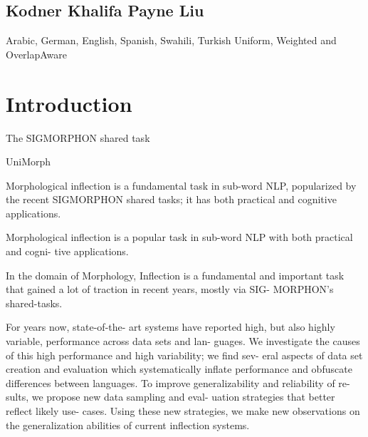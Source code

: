 \documentclass[11pt]{article}
\begin{document}
\subsection{Kodner Khalifa Payne Liu}

Arabic, German, English, Spanish, Swahili, Turkish 
Uniform, Weighted and OverlapAware 

\section{Introduction}

The SIGMORPHON shared task \citep{cotterell-etal-2016-sigmorphon, cotterell-etal-2017-conll, cotterell-etal-2018-conll, mccarthy-etal-2019-sigmorphon, vylomova-etal-2020-sigmorphon, pimentel-ryskina-etal-2021-sigmorphon, kodner-khalifa-2022-sigmorphon, goldman-etal-2023-sigmorphon}

UniMorph \citep{mccarthy-etal-2020-unimorph, batsuren-etal-2022-unimorph}



\citet{goldman-etal-2022-un}

\citet{kodner-etal-2023-morphological}

\citet{kodner-khalifa-2022-sigmorphon}

\citet{kodner-etal-2023-exploring}

\citet{kodner2023re}


Morphological inflection is a fundamental task in sub-word NLP, popularized by the recent SIGMORPHON shared tasks; it has both practical and cognitive applications. 






Morphological inflection is a popular task in sub-word NLP with both practical and cogni- tive applications.

In the domain of Morphology, Inflection is a fundamental and important task that gained a lot of traction in recent years, mostly via SIG- MORPHON’s shared-tasks. 




For years now, state-of-the- art systems have reported high, but also highly variable, performance across data sets and lan- guages. We investigate the causes of this high performance and high variability; we find sev- eral aspects of data set creation and evaluation which systematically inflate performance and obfuscate differences between languages. To improve generalizability and reliability of re- sults, we propose new data sampling and eval- uation strategies that better reflect likely use- cases. Using these new strategies, we make new observations on the generalization abilities of current inflection systems.
\end{document}
